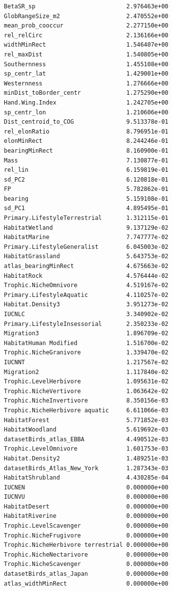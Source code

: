 \documentclass[
  letterpaper,
  DIV=11,
  numbers=noendperiod]{scrartcl}
\begin{document}
\begin{verbatim}
BetaSR_sp                          2.976463e+00
GlobRangeSize_m2                   2.470552e+00
mean_prob_cooccur                  2.277150e+00
rel_relCirc                        2.136166e+00
widthMinRect                       1.546407e+00
rel_maxDist                        1.540805e+00
Southernness                       1.455108e+00
sp_centr_lat                       1.429001e+00
Westernness                        1.276666e+00
minDist_toBorder_centr             1.275290e+00
Hand.Wing.Index                    1.242705e+00
sp_centr_lon                       1.210606e+00
Dist_centroid_to_COG               9.513378e-01
rel_elonRatio                      8.796951e-01
elonMinRect                        8.244246e-01
bearingMinRect                     8.160900e-01
Mass                               7.130877e-01
rel_lin                            6.159819e-01
sd_PC2                             6.120818e-01
FP                                 5.782862e-01
bearing                            5.159108e-01
sd_PC1                             4.895495e-01
Primary.LifestyleTerrestrial       1.312115e-01
HabitatWetland                     9.137129e-02
HabitatMarine                      7.747777e-02
Primary.LifestyleGeneralist        6.045003e-02
HabitatGrassland                   5.643753e-02
atlas_bearingMinRect               4.675663e-02
HabitatRock                        4.576444e-02
Trophic.NicheOmnivore              4.519167e-02
Primary.LifestyleAquatic           4.110257e-02
Habitat.Density3                   3.951273e-02
IUCNLC                             3.340902e-02
Primary.LifestyleInsessorial       2.350233e-02
Migration3                         1.896709e-02
HabitatHuman Modified              1.516700e-02
Trophic.NicheGranivore             1.339470e-02
IUCNNT                             1.217567e-02
Migration2                         1.117840e-02
Trophic.LevelHerbivore             1.095631e-02
Trophic.NicheVertivore             1.063642e-02
Trophic.NicheInvertivore           8.350156e-03
Trophic.NicheHerbivore aquatic     6.611066e-03
HabitatForest                      5.771852e-03
HabitatWoodland                    5.619692e-03
datasetBirds_atlas_EBBA            4.490512e-03
Trophic.LevelOmnivore              1.601753e-03
Habitat.Density2                   1.489251e-03
datasetBirds_Atlas_New_York        1.287343e-03
HabitatShrubland                   4.430285e-04
IUCNEN                             0.000000e+00
IUCNVU                             0.000000e+00
HabitatDesert                      0.000000e+00
HabitatRiverine                    0.000000e+00
Trophic.LevelScavenger             0.000000e+00
Trophic.NicheFrugivore             0.000000e+00
Trophic.NicheHerbivore terrestrial 0.000000e+00
Trophic.NicheNectarivore           0.000000e+00
Trophic.NicheScavenger             0.000000e+00
datasetBirds_atlas_Japan           0.000000e+00
atlas_widthMinRect                 0.000000e+00
\end{verbatim}
\end{document}
